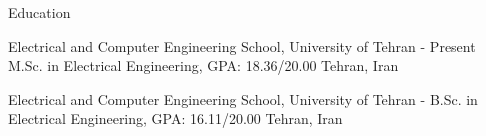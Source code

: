 \documentclass[../professional-cv.tex]{subfiles}
\begin{document}
	\begin{rSection}{ Education }
		
		
		\rSubsectionHeading
		{Electrical and Computer Engineering School, \nem University of Tehran}
		{  - Present }
		{\normalfont M.Sc. in Electrical Engineering, GPA: 18.36/20.00}
		{Tehran, Iran}
	
		\rSubsectionHeading
		{Electrical and Computer Engineering School, \nem University of Tehran}
		{  -  }
		{\normalfont B.Sc. in Electrical Engineering, GPA: 16.11/20.00}
		{Tehran, Iran}
		
		
	\end{rSection}
\end{document}
